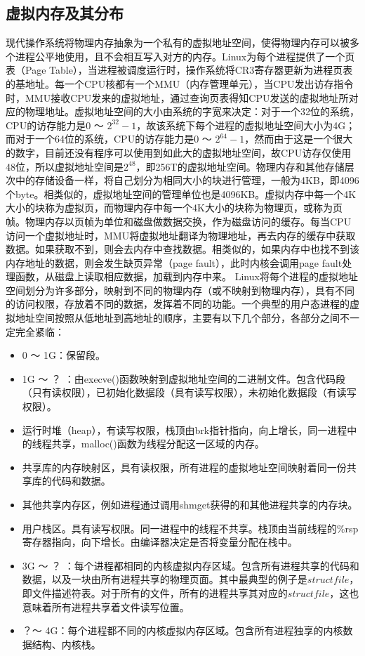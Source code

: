 \subsection{虚拟内存及其分布}
现代操作系统将物理内存抽象为一个私有的虚拟地址空间，使得物理内存可以被多个进程公平地使用，且不会相互写入对方的内存。Linux为每个进程提供了一个页表（Page Table），当进程被调度运行时，操作系统将CR3寄存器更新为进程页表的基地址。每一个CPU核都有一个MMU（内存管理单元），当CPU发出访存指令时，MMU接收CPU发来的虚拟地址，通过查询页表得知CPU发送的虚拟地址所对应的物理地址。虚拟地址空间的大小由系统的字宽来决定：对于一个32位的系统，CPU的访存能力是0 ～ $2^{32}-1$，故该系统下每个进程的虚拟地址空间大小为4G；而对于一个64位的系统，CPU的访存能力是0 ～ $2^{64}-1$，然而由于这是一个很大的数字，目前还没有程序可以使用到如此大的虚拟地址空间，故CPU访存仅使用48位，所以虚拟地址空间是$2^{48}$，即256T的虚拟地址空间。物理内存和其他存储层次中的存储设备一样，将自己划分为相同大小的块进行管理，一般为4KB，即4096个byte。相类似的，虚拟地址空间的管理单位也是4096KB。虚拟内存中每一个4K大小的块称为虚拟页，而物理内存中每一个4K大小的块称为物理页，或称为页帧。物理内存以页帧为单位和磁盘做数据交换，作为磁盘访问的缓存。每当CPU访问一个虚拟地址时，MMU将虚拟地址翻译为物理地址，再去内存的缓存中获取数据。如果获取不到，则会去内存中查找数据。相类似的，如果内存中也找不到该内存地址的数据，则会发生缺页异常（page fault），此时内核会调用page fault处理函数，从磁盘上读取相应数据，加载到内存中来。
\label{chap:mem}
Linux将每个进程的虚拟地址空间划分为许多部分，映射到不同的物理内存（或不映射到物理内存），具有不同的访问权限，存放着不同的数据，发挥着不同的功能。一个典型的用户态进程的虚拟地址空间按照从低地址到高地址的顺序，主要有以下几个部分，各部分之间不一定完全紧临：
\begin{itemize}
  \item 0 ～ 1G：保留段。
  \item 1G ～ ？ ：由execve()函数映射到虚拟地址空间的二进制文件。包含代码段（只有读权限），已初始化数据段（具有读写权限），未初始化数据段（有读写权限）。
  \item 运行时堆（heap），有读写权限，栈顶由brk指针指向，向上增长，同一进程中的线程共享，malloc()函数为线程分配这一区域的内存。
  \item 共享库的内存映射区，具有读权限，所有进程的虚拟地址空间映射着同一份共享库的代码和数据。
  \item 其他共享内存区，例如进程通过调用shmget获得的和其他进程共享的内存块。
  \item 用户栈区。具有读写权限。同一进程中的线程不共享。栈顶由当前线程的\%rsp寄存器指向，向下增长。由编译器决定是否将变量分配在栈中。
  \item 3G ～ ？ ：每个进程都相同的内核虚拟内存区域。包含所有进程共享的代码和数据，以及一块由所有进程共享的物理页面。其中最典型的例子是$struct file$，即文件描述符表。对于所有的文件，所有的进程共享其对应的$struct file$，这也意味着所有进程共享着文件读写位置。
  \item ？～ 4G：每个进程都不同的内核虚拟内存区域。包含所有进程独享的内核数据结构、内核栈。
\end{itemize}
